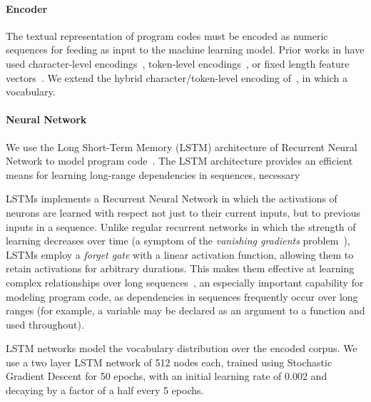 \paragraph{Encoder} The textual representation of program codes must be encoded as numeric sequences for feeding as input to the machine learning model. Prior works in have used character-level encodings~\cite{Cummins2017a}, token-level encodings~\cite{TODO}, or fixed length feature vectors~\cite{TODO}. We extend the hybrid character/token-level encoding of~\cite{Cummins2017b}, in which a vocabulary.

\paragraph{Neural Network} We use the Long Short-Term Memory (LSTM) architecture of Recurrent Neural Network to model program code~\cite{Hochreiter1997}. The LSTM architecture provides an efficient means for learning long-range dependencies in sequences, necessary 

LSTMs implements a Recurrent Neural Network in which the activations of neurons are learned with respect not just to their current inputs, but to previous inputs in a sequence. Unlike regular recurrent networks in which the strength of learning decreases over time (a symptom of the \emph{vanishing gradients} problem~\cite{Pacanu2013}), LSTMs employ a \emph{forget gate} with a linear activation function, allowing them to retain activations for arbitrary durations. This makes them effective at learning complex relationships over long sequences~\cite{Lipton2015}, an especially important capability for modeling program code, as dependencies in sequences frequently occur over long ranges (for example, a variable may be declared as an argument to a function and used throughout).


LSTM networks model the vocabulary distribution over the encoded corpus. We use a two layer LSTM network of 512 nodes each, trained using Stochastic Gradient Descent for 50 epochs, with an initial learning rate of 0.002 and decaying by a factor of a half every 5 epochs. %


